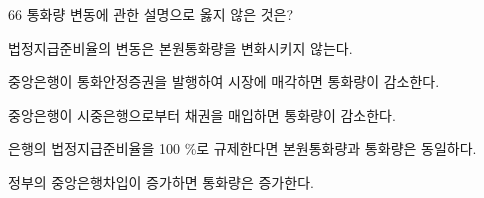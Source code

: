 \begin{question}{66}
통화량 변동에 관한 설명으로 옳지 않은 것은?
\begin{choices}
  \item 법정지급준비율의 변동은 본원통화량을 변화시키지 않는다.
  \item 중앙은행이 통화안정증권을 발행하여 시장에 매각하면 통화량이 감소한다.
  \item 중앙은행이 시중은행으로부터 채권을 매입하면 통화량이 감소한다.
  \item 은행의 법정지급준비율을 100 \%로 규제한다면 본원통화량과 통화량은 동일하다.
  \item 정부의 중앙은행차입이 증가하면 통화량은 증가한다.
\end{choices}
\end{question}
